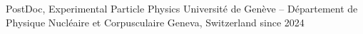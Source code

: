 \begin{cventries}
  \cventry%
    {PostDoc, Experimental Particle Physics} %
    {Universit\'e de Gen\`eve -- D\'epartement de Physique Nucl\'eaire et Corpusculaire} %
    {Geneva, Switzerland} %
    {since 2024} %
    {}%
\end{cventries}

